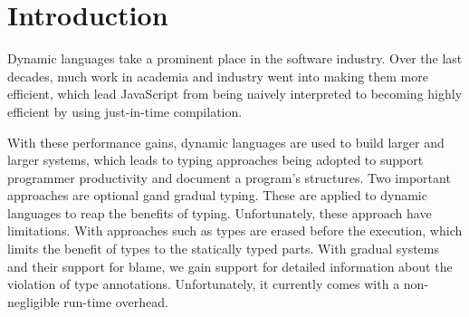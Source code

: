 
\section{Introduction}
\label{sec:introduction}

%
%

Dynamic languages take a prominent place in the software industry.
Over the last decades, much work in academia and industry
went into making them more efficient\citep{Self,Bolz2013,Bolz:2013:IMT,Wurthinger:2017:PPE,Daloze2016,Clifford:2015:MM,Degenbaev:2016:ITG},
which lead JavaScript from being naively interpreted
to becoming highly efficient by using just-in-time compilation.


With these performance gains,
dynamic languages are used to build larger and larger systems,
which leads to typing approaches being adopted
to support programmer productivity and document a program's structures.
Two important approaches are optional\citep{GiladPluggable2004}
gand gradual typing\citep{Siek2006,Siek2015}.
These are applied to dynamic languages to reap the benefits of typing.
Unfortunately, these approach have limitations.
With approaches such as 
types are erased before the execution,
which limits the benefit of types to the statically typed parts.
With gradual systems and their support for blame,
we gain support for detailed information
about the violation of type annotations.
Unfortunately, it currently comes with a non-negligible run-time overhead\citep{Takikawa2016,Vitousek2017,Muehlboeck2017,Bauman2017,Richards2017,Stulova2016,Greenman2018}.

